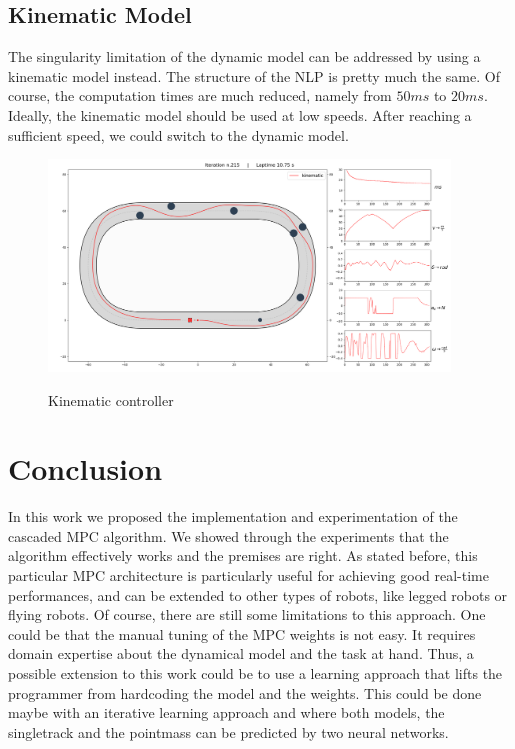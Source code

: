 \documentclass[a4paper, onecolumn, 11pt]{article}
\begin{document}
\subsection{Kinematic Model}

The singularity limitation of the dynamic model can be addressed by using a
kinematic model instead. The structure of the NLP is pretty much the same. Of
course, the computation times are much reduced, namely from $50ms$ to $20ms$.
Ideally, the kinematic model should be used at low speeds. After reaching a
sufficient speed, we could switch to the dynamic model.
\begin{figure}[H]
    \centering
    \includegraphics[width=0.95\textwidth]{assets/kinematic_ippodromo.png}
    \label{kin}
    \caption{Kinematic controller}
\end{figure}



\section{Conclusion}

In this work we proposed the implementation and experimentation of the cascaded
MPC algorithm. We showed through the experiments that the algorithm effectively
works and the premises are right. As stated before, this particular MPC
architecture is particularly useful for achieving good real-time performances,
and can be extended to other types of robots, like legged robots or flying
robots. Of course, there are still some limitations to this approach. One could
be that the manual tuning of the MPC weights is not easy. It requires domain
expertise about the dynamical model and the task at hand. Thus, a possible
extension to this work could be to use a learning approach that lifts the
programmer from hardcoding the model and the weights. This could be done maybe
with an iterative learning approach and where both models, the singletrack and
the pointmass can be predicted by two neural networks.



\end{document}
